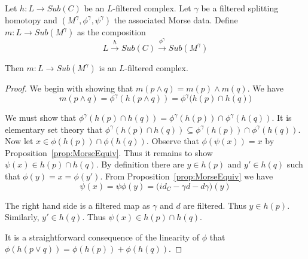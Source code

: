 \begin{prop}
Let $h:L\to Sub(C)$ be an $L$-filtered complex.  Let $\gamma$ be a filtered splitting homotopy and $(M^\gamma,\phi^\gamma,\psi^\gamma)$ the associated Morse data. Define $m:L\to Sub(M^\gamma)$ as the composition $$L\xrightarrow{h} Sub(C) \xrightarrow{\phi^\gamma} Sub(M^\gamma)$$

Then  $m:L\to Sub(M^\gamma)$ is an $L$-filtered complex.
\end{prop}
\begin{proof}
We begin with showing that $m(p \wedge q) = m(p)\wedge m(q)$.  We have $$m(p\wedge q) = \phi^\gamma(h(p\wedge q)) = \phi^\gamma \big(h(p)\cap h(q) \big)$$

We must show that $\phi^\gamma(h(p)\cap h(q)) = \phi^\gamma(h(p))\cap \phi^\gamma(h(q))$.  It is elementary set theory that $\phi^\gamma(h(p)\cap h(q))\subseteq \phi^\gamma (h(p))\cap \phi^\gamma (h(q))$.  Now let $x\in \phi(h(p))\cap \phi(h(q))$.     Observe that $\phi(\psi(x)) = x$ by Proposition~\ref{prop:MorseEquiv}.  Thus it remains to show $\psi(x)\in h(p)\cap h(q)$.   By definition there are $y\in h(p)$ and $y'\in h(q)$ such that $\phi(y)=x=\phi(y')$.  From Proposition~\ref{prop:MorseEquiv} we have $$\psi(x) = \psi\phi(y) = \big(id_C-\gamma d-d\gamma\big)(y)$$

The right hand side is a filtered map as $\gamma$ and $d$ are filtered.  Thus $y\in h(p)$.  Similarly, $y'\in h(q)$.  Thus $\psi(x)\in h(p)\cap h(q)$.

It is a straightforward consequence of the linearity of $\phi$ that $\phi(h(p\vee q)) = \phi(h(p))+\phi(h(q))$.


%
%
%
%
\end{proof}


